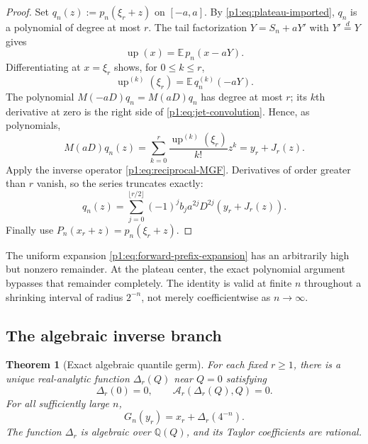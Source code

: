 \documentclass[11pt,oneside]{article}
\numberwithin{equation}{section}
\newtheorem{theorem}{Theorem}[section]
\theoremstyle{definition}
\theoremstyle{remark}
\newcommand{\Q}{\mathbb Q}
\newcommand{\E}{\mathbb E}
\newcommand{\Up}{\operatorname{up}}
\newcommand{\Fn}{P_n}
\begin{document}
\begin{proof}
Set $q_n(z):=p_n(\xi_r+z)$ on $[-a,a]$.  By
\eqref{p1:eq:plateau-imported}, $q_n$ is a polynomial of degree at most $r$.
The tail factorization $Y=S_n+aY'$ with $Y'\stackrel d=Y$ gives
\begin{equation}
 \Up(x)=\E\,p_n(x-aY).
 \label{p1:eq:convolution-expectation}
\end{equation}
Differentiating at $x=\xi_r$ shows, for $0\le k\le r$,
\begin{equation}
 \Up^{(k)}(\xi_r)=\E\,q_n^{(k)}(-aY).
 \label{p1:eq:jet-convolution}
\end{equation}
The polynomial $M(-aD)q_n=M(aD)q_n$ has degree at most $r$; its $k$th
derivative at zero is the right side of \eqref{p1:eq:jet-convolution}.  Hence, as
polynomials,
\begin{equation}
 M(aD)q_n(z)=
 \sum_{k=0}^{r}\frac{\Up^{(k)}(\xi_r)}{k!}z^k
 =y_r+J_r(z).
 \label{p1:eq:polynomial-smoothing}
\end{equation}
Apply the inverse operator \eqref{p1:eq:reciprocal-MGF}.  Derivatives of order greater
than $r$ vanish, so the series truncates exactly:
\[
 q_n(z)=\sum_{j=0}^{\lfloor r/2\rfloor}
 (-1)^jb_ja^{2j}D^{2j}(y_r+J_r(z)).
\]
Finally use $\Fn(x_r+z)=p_n(\xi_r+z)$.
\end{proof}

\begin{remark}
The uniform expansion \eqref{p1:eq:forward-prefix-expansion} has an arbitrarily high but
nonzero remainder.  At the plateau center, the exact polynomial argument bypasses that
remainder completely.  The identity is valid at finite $n$ throughout a shrinking interval
of radius $2^{-n}$, not merely coefficientwise as $n\to\infty$.
\end{remark}

\subsection{The algebraic inverse branch}

\begin{theorem}[Exact algebraic quantile germ]
\label{p1:thm:algebraic-germ}
For each fixed $r\ge1$, there is a unique real-analytic function $\Delta_r(Q)$ near
$Q=0$ satisfying
\begin{equation}
 \Delta_r(0)=0,
 \qquad
 \mathcal A_r(\Delta_r(Q),Q)=0.
 \label{p1:eq:Delta-implicit}
\end{equation}
For all sufficiently large $n$,
\begin{equation}
 \boxed{
 G_n(y_r)=x_r+\Delta_r(4^{-n}).}
 \label{p1:eq:exact-quantile-germ}
\end{equation}
The function $\Delta_r$ is algebraic over $\Q(Q)$, and its Taylor coefficients are
rational.
\end{theorem}
\end{document}
